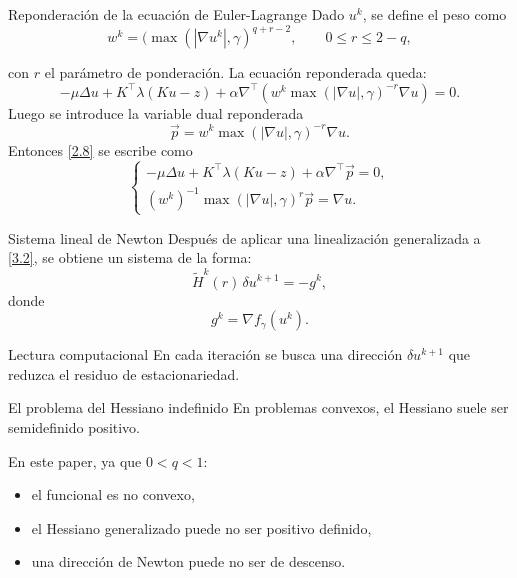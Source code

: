 \documentclass[9pt]{beamer}
\begin{document}
\begin{frame}{Reponderación de la ecuación de Euler-Lagrange}
Dado \(u^k\), se define el peso como 
\[
    w^k=(\max(|\nabla u^k|,\gamma)^{q+r-2}, \qquad 0\leq r\leq 2-q,
\]

con $r$ el parámetro de ponderación. La ecuación reponderada queda:
\[
-\mu\Delta u + K^\top\lambda(Ku-z)
+\alpha\nabla^\top\left(w^k\max(|\nabla u|,\gamma)^{-r}\nabla u\right)=0.
\]
Luego se introduce la variable dual reponderada 
$$
\overrightarrow{p}=w^k\max(|\nabla u|, \gamma)^{-r}\nabla u.
$$
Entonces \eqref{2.8} se escribe como 
\begin{equation}
\begin{cases}
-\mu\Delta u + K^\top\lambda(Ku-z)+\alpha\nabla^\top \overrightarrow{p}=0,\\[4pt]
(w^k)^{-1}\max(|\nabla u|,\gamma)^r\overrightarrow{p}=\nabla u.
\end{cases}
\label{3.2}    
\end{equation}
\end{frame}

\begin{frame}{Sistema lineal de Newton}
Después de aplicar una linealización generalizada a \eqref{3.2}, se obtiene un sistema de la forma:
\[
    \widetilde H^k(r)\,\delta u^{k+1}=-g^k,
\]
donde
\[
    g^k=\nabla f_\gamma(u^k).
\]

\begin{block}{Lectura computacional}
En cada iteración se busca una dirección \(\delta u^{k+1}\) que reduzca el residuo de estacionariedad.
\end{block}
\end{frame}

\begin{frame}{El problema del Hessiano indefinido}
En problemas convexos, el Hessiano suele ser semidefinido positivo.

\vspace{0.2cm}
En este paper, ya que \(0<q<1\):
\begin{itemize}
    \item el funcional es no convexo,
    \item el Hessiano generalizado puede no ser positivo definido,
    \item una dirección de Newton puede no ser de descenso.
\end{itemize}

\end{frame}
\end{document}

